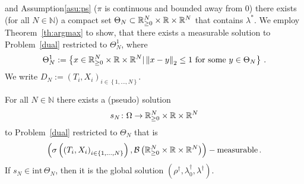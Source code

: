 and Assumption\ref{asu:ps} ($\pi$ is continuous and bounded away from 0)
there exists (for all $N\in\mathbb{N}$) a compact set 
$
\Theta_N\subset
\mathbb{R}^N_{\ge 0}\times \mathbb{R}\times \mathbb{R}^N
$
that contains $\lambda^*$. 
We employ Theorem~\ref{th:argmax} to show, that there exists a measurable solution to Problem~\ref{dual} restricted to $\Theta_N^1$,
where 
\begin{align*}
  \Theta_N^1
  :=
  \left\{
    x\in 
\R^N_{\ge 0}\times \R\times \R^N
|
\norm{x-y}_2\le 1
\ 
\text{for some}\ 
y\in\Theta_N
  \right\}
  \,.
\end{align*}
We write $D_N:=(T_i,X_i)_{i\in \left\{
  1,\ldots,N
\right\}}$.
\begin{lemma}
  \label{lem:pseud_sol}
  For all $N\in\mathbb{N}$ there exists a (pseudo) solution
  \begin{align*}
    s_N\colon
    \Omega
    \to
  \mathbb{R}^N_{\ge 0}
  \times
  \mathbb{R}
  \times
  \mathbb{R}^{N}
  \end{align*}
  to
  Problem~\ref{dual} restricted to $\Theta_N$ 
  that is
  \begin{align*}
  \left(
    \sigma \left( \left( T_i,X_i \right)_{i\in \left\{ 1,\ldots,N \right\}} \right),\mathcal{B}
  \left(
  \mathbb{R}^N_{\ge 0}
  \times
  \mathbb{R}
  \times
  \mathbb{R}^{N}
  \right)
  \right)
  -\text{measurable}
  \,.
  \end{align*}
If $s_N\in \mathrm{int}\, \Theta_N$, then it is the global solution
  $
  (\rho^\dagger,\lambda_0^\dagger,\lambda^\dagger)
  $.
\end{lemma}
